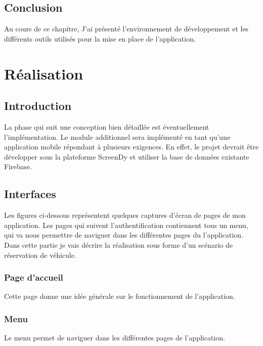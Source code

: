 \documentclass[12pt,a4paper]{report}
\begin{document}
		\section{Conclusion}
Au cours de ce chapitre, J'ai présenté l’environnement de développement et les différents outils utilisés pour la mise en place de l’application.













	\chapter{Réalisation}

	\section{Introduction}
La phase qui suit une conception bien détaillée est éventuellement l’implémentation. Le module additionnel sera implémenté en tant qu’une application mobile répondant à plusieurs exigences. En effet, le projet devrait être développer sous la plateforme ScreenDy et utiliser la base de données existante Firebase.


	\section{Interfaces}
Les figures ci-dessous représentent quelques captures d’écran de pages de mon application. Les pages qui suivent l’authentification contiennent tous un menu, qui va nous permettre de naviguer dans les différentes pages du l'application.\\
Dans cette partie je vais décrire la réalisation sous forme d’un scénario de réservation de véhicule.

	\subsection{Page d'accueil}
Cette page donne une idée générale sur le fonctionnement de l'application.

	\subsection{Menu}
Le menu permet de naviguer dans les différentes pages de l'application.
\end{document}
